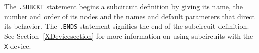 


\label{SUBCKTsection}
The  \texttt{.SUBCKT} statement begins a subcircuit
definition by giving its name, the number and order of its nodes and the names
and default parameters that direct its behavior.  The \texttt{.ENDS} statement
signifies the end of the subcircuit definition. See Section~\ref{XDevicesection}
for more information on using subcircuits with the \texttt{X} device.


